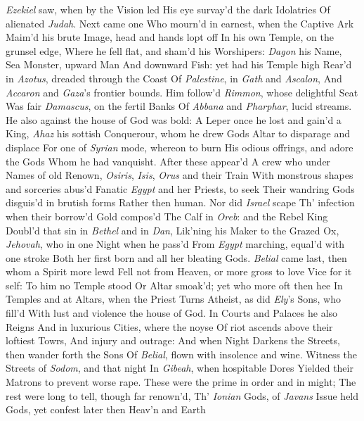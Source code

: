 \documentclass[11pt]{book}
\newcounter {first}
\newcounter {last}
\begin{document}
\textit{Ezekiel} saw, when by the Vision led 
His eye survay'd the dark Idolatries 
Of alienated \textit{Judah}.  Next came one 
Who mourn'd in earnest, when the Captive Ark 
Maim'd his brute Image, head and hands lopt off 
In his own Temple, on the grunsel edge, 
Where he fell flat, and sham'd his Worshipers: 
\textit{Dagon} his Name, Sea Monster, upward Man 
And downward Fish: yet had his Temple high 
Rear'd in \textit{Azotus}, dreaded through the Coast 
Of \textit{Palestine}, in \textit{Gath} and \textit{Ascalon}, 
And \textit{Accaron} and \textit{Gaza}'s frontier bounds. 
Him follow'd \textit{Rimmon}, whose delightful Seat 
Was fair \textit{Damascus}, on the fertil Banks 
Of \textit{Abbana} and \textit{Pharphar}, lucid streams. 
He also against the house of God was bold: 
A Leper once he lost and gain'd a King, 
\textit{Ahaz} his sottish Conquerour, whom he drew 
Gods Altar to disparage and displace 
For one of \textit{Syrian} mode, whereon to burn 
His odious offrings, and adore the Gods 
Whom he had vanquisht.  After these appear'd 
A crew who under Names of old Renown, 
\textit{Osiris}, \textit{Isis}, \textit{Orus} and their Train 
With monstrous shapes and sorceries abus'd 
Fanatic \textit{Egypt} and her Priests, to seek 
Their wandring Gods disguis'd in brutish forms 
Rather then human.  Nor did \textit{Israel} scape 
Th' infection when their borrow'd Gold compos'd 
The Calf in \textit{Oreb}: and the Rebel King 
Doubl'd that sin in \textit{Bethel} and in \textit{Dan}, 
Lik'ning his Maker to the Grazed Ox, 
\textit{Jehovah}, who in one Night when he pass'd 
From \textit{Egypt} marching, equal'd with one stroke 
Both her first born and all her bleating Gods. 
\textit{Belial} came last, then whom a Spirit more lewd 
Fell not from Heaven, or more gross to love 
Vice for it self: To him no Temple stood 
Or Altar smoak'd; yet who more oft then hee 
In Temples and at Altars, when the Priest 
Turns Atheist, as did \textit{Ely}'s Sons, who fill'd 
With lust and violence the house of God. 
In Courts and Palaces he also Reigns 
And in luxurious Cities, where the noyse 
Of riot ascends above their loftiest Towrs, 
And injury and outrage: And when Night 
Darkens the Streets, then wander forth the Sons 
Of \textit{Belial}, flown with insolence and wine. 
Witness the Streets of \textit{Sodom}, and that night 
In \textit{Gibeah}, when hospitable Dores 
Yielded their Matrons to prevent worse rape. 
These were the prime in order and in might; 
The rest were long to tell, though far renown'd, 
Th' \textit{Ionian} Gods, of \textit{Javans} Issue held 
Gods, yet confest later then Heav'n and Earth 
\end{document}
